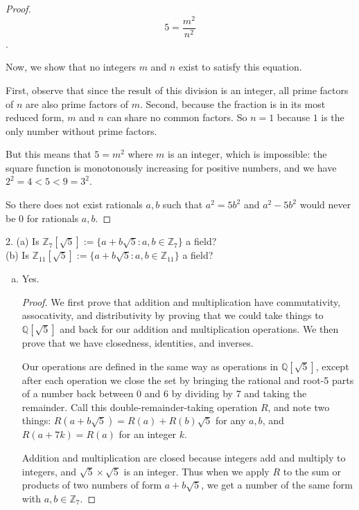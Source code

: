 \documentclass[12pt]{article} %
\newcommand{\Z}{\mathbb{Z}}
\newcommand{\Q}{\mathbb{Q}}
\begin{document}
\begin{flushleft}
\begin{proof}
  $$5 = \frac{m^2}{n^2}$$.

  Now, we show that no integers $m$ and $n$ exist to satisfy this equation.

  First, observe that since the result of this division is an integer, all prime factors of $n$ are also prime factors of $m$. Second, because the fraction is in its most reduced form, $m$ and $n$ can share no common factors. So $n=1$ because $1$ is the only number without prime factors.

  But this means that $5=m^2$ where $m$ is an integer, which is impossible: the square function is monotonously increasing for positive numbers, and we have $2^2 = 4 < 5 < 9 = 3^2$.

  So there does not exist rationals $a, b$ such that $a^2 = 5b^2$ and $a^2-5b^2$ would never be $0$ for rationals $a, b$.

\end{proof}
\vspace{1cm}

\newpage%

2. (a) Is $\Z_{7}[\sqrt{5}] := \{a + b\sqrt{5} : a, b \in \Z_7\}$ a field?\\
   (b) Is $\Z_{11}[\sqrt{5}] := \{a + b\sqrt{5} : a, b \in \Z_{11}\}$ a field?\\

\vspace{0.5cm}
\begin{enumerate}[(a)]
  \item Yes.


\begin{proof}
  We first prove that addition and multiplication have commutativity, assocativity, and distributivity by proving that we could take things to $\Q[\sqrt5]$ and back for our addition and multiplication operations. We then prove that we have closedness, identities, and inverses.

  Our operations are defined in the same way as operations in $\Q[\sqrt5]$, except after each operation we close the set by bringing the rational and root-5 parts of a number back between $0$ and $6$ by dividing by $7$ and taking the remainder. Call this double-remainder-taking operation $R$, and note two things: $R(a+b\sqrt 5) = R(a) + R(b)\sqrt5$ for any $a, b$, and $R(a+7k) = R(a)$ for an integer $k$.

  Addition and multiplication are closed because integers add and multiply to integers, and $\sqrt5 \times \sqrt5$ is an integer. Thus when we apply $R$ to the sum or products of two numbers of form $a+b\sqrt5$, we get a number of the same form with $a, b\in \Z_7$.


\end{proof}
\end{enumerate}
\end{flushleft}
\end{document}
